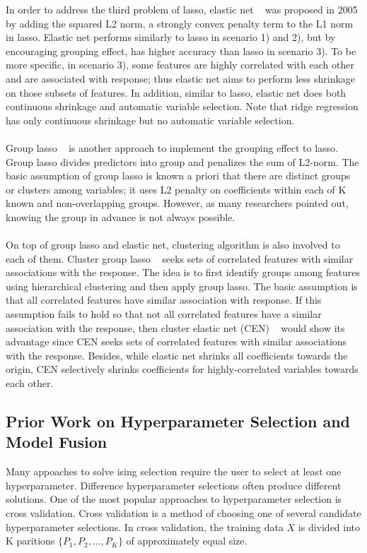 \documentclass[11pt]{article}
\begin{document}
In order to address the third problem of lasso, elastic net ~\cite{Zou2005Reg} was proposed in 2005 by adding the squared L2 norm, a strongly convex penalty term to the L1 norm in lasso. Elastic net performs similarly to lasso in scenario 1) and 2), but by encouraging grouping effect, has higher accuracy than lasso in scenario 3). To be more specific, in scenario 3), some features are highly correlated with each other and are associated with response; thus elastic net aims to perform less shrinkage on those subsets of features. In addition, similar to lasso, elastic net does both continuous shrinkage and automatic variable selection. Note that ridge regression has only continuous shrinkage but no automatic variable selection.
\\ \\
Group lasso ~\cite{Francis2008Con} is another approach to implement the grouping effect to lasso. Group lasso divides predictors into group and penalizes the sum of L2-norm. The basic assumption of group lasso is known a priori that there are distinct groups or clusters among variables; it uses L2 penalty on coefficients within each of K known and non-overlapping groups. However, as many researchers pointed out, knowing the group in advance is not always possible.
\\ \\
On top of group lasso and elastic net, clustering algorithm is also involved to each of them. Cluster group lasso ~\cite{Peter2013Cor} seeks sets of correlated features with similar associations with the response. The idea is to first identify groups among features using hierarchical clustering and then apply group lasso. The basic assumption is that all correlated features have similar association with response. If this assumption fails to hold so that not all correlated features have a similar association with the response, then cluster elastic net (CEN) ~\cite{Dan2014The} would show its advantage since CEN seeks sets of correlated features with similar associations with the response. Besides, while elastic net shrinks all coefficients towards the origin, CEN selectively shrinks coefficients for highly-correlated variables towards each other.

\subsection{Prior Work on Hyperparameter Selection and Model Fusion}
Many appoaches to solve ising selection require the user to select at least one hyperparameter.  Difference hyperparameter selections often produce different solutions.  One of the most popular approaches to hyperparameter selection is cross validation. Cross validation is a method of choosing one of several candidate hyperparameter selections.  In cross validation, the training data $X$ is divided into K paritions $\{P_1,P_2,\hdots,P_K\}$ of approximately equal size.
\end{document}

